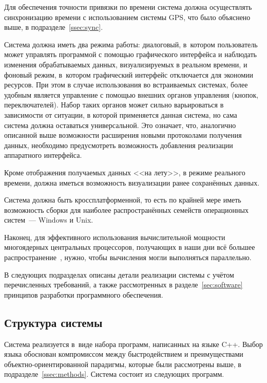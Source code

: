 \documentclass[a4paper, 14pt, titlepage]{extarticle}
\newcommand{\eng}[1]{\foreignlanguage{english}{#1}}
\begin{document}
  Для обеспечения точности привязки по времени система должна осуществлять синхронизацию времени с
  использованием системы GPS, что было объяснено выше, в подразделе~\ref{ssec:sync}.

  Система должна иметь два режима работы: диалоговый, в~котором пользователь может управлять
  программой с помощью графического интерфейса и наблюдать изменения обрабатываемых данных,
  визуализируемых в реальном времени, и фоновый режим, в~котором графический интерфейс отключается
  для экономии ресурсов.
  При этом в случае использования во встраиваемых системах, более удобным является управление с
  помощью внешних органов управления (кнопок, переключателей). Набор таких органов может
  сильно варьироваться в зависимости от ситуации, в которой применяется данная система, но сама
  система должна оставаться универсальной. Это означает, что, аналогично описанной выше возможности
  расширения новыми протоколами получения данных, необходимо предусмотреть возможность добавления
  реализации аппаратного интерфейса.

  Кроме отображения получаемых данных <<на лету>>, в режиме реального времени, должна иметься
  возможность визуализации ранее сохранённых данных.

  Система должна быть кроссплатформенной, то есть по крайней мере иметь возможность сборки для
  наиболее распространённых семейств операционных систем~--- \eng{Windows} и \eng{Unix}.

  Наконец, для эффективного использования вычислительной мощности многоядерных центральных
  процессоров, получающих в наши дни всё большее распространение~\cite{steam-hardware}, нужно, чтобы
  вычисления могли выполняться параллельно.

  В следующих подразделах описаны детали реализации системы с учётом перечисленных требований, а
  также рассмотренных в разделе~\ref{sec:software} принципов разработки программного обеспечения.

  \subsection{Структура системы}\label{ssec:structure}

  Система реализуется в~виде набора программ, написанных на языке C++. Выбор языка обоснован
  компромиссом между быстродействием и преимуществами объектно-ориентированной парадигмы, которые
  были рассмотрены выше, в подразделе~\ref{ssec:methods}. Система состоит из следующих программ.
\end{document}
